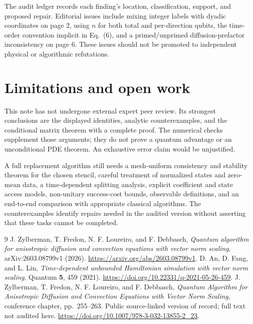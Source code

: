 \documentclass[11pt]{article}
\begin{document}

The audit ledger records each finding's location, classification,
support, and proposed repair. Editorial issues include mixing integer
labels with dyadic coordinates on page 2, using $n$ for both total
and per-direction qubits, the time-order convention implicit in
Eq.~(6), and a primed/unprimed diffusion-prefactor inconsistency
on page 6. These issues should not be promoted to independent physical
or algorithmic refutations.

\section{Limitations and open work}
This note has not undergone external expert peer review.
Its strongest conclusions are the displayed identities,
analytic counterexamples, and the conditional matrix theorem with
a complete proof. The numerical checks supplement those arguments;
they do not prove a quantum advantage or an unconditional PDE theorem.
An exhaustive error claim would be unjustified.

A full replacement algorithm still needs a mesh-uniform consistency
and stability theorem for the chosen stencil, careful treatment of
normalized states and zero-mean data, a time-dependent splitting
analysis, explicit coefficient and state access models, non-unitary
success-cost bounds, observable definitions, and an end-to-end comparison
with appropriate classical algorithms. The counterexamples identify
repairs needed in the audited version without asserting that these
tasks cannot be completed.

\begin{thebibliography}{9}
J. Zylberman, T. Fredon, N. F. Loureiro, and F. Debbasch,
\emph{Quantum algorithm for anisotropic diffusion and convection equations
with vector norm scaling}, arXiv:2603.08799v1 (2026).
\url{https://arxiv.org/abs/2603.08799v1}.
D. An, D. Fang, and L. Lin,
\emph{Time-dependent unbounded Hamiltonian simulation with vector norm
scaling}, Quantum \textbf{5}, 459 (2021).
\url{https://doi.org/10.22331/q-2021-05-26-459}.
J. Zylberman, T. Fredon, N. F. Loureiro, and F. Debbasch,
\emph{Quantum Algorithm for Anisotropic Diffusion and Convection Equations
with Vector Norm Scaling}, conference chapter, pp.~255--263.
Public source-linked version of record; full text not audited here.
\url{https://doi.org/10.1007/978-3-032-13855-2_23}.
\end{thebibliography}
\end{document}
